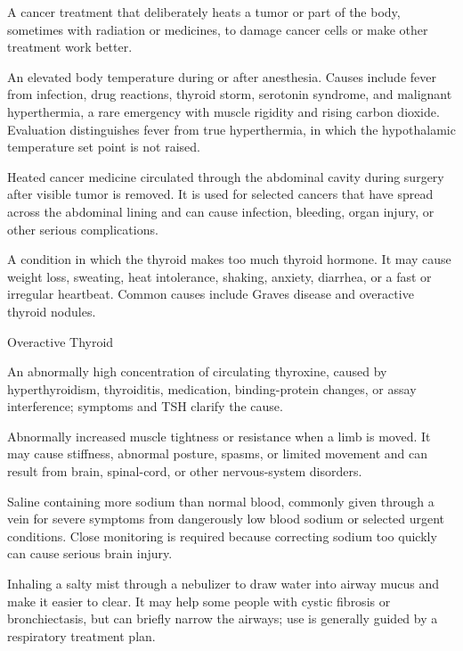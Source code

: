  A cancer treatment that deliberately heats a tumor or part of the body, sometimes with radiation or medicines, to damage cancer cells or make other treatment work better.

 An elevated body temperature during or after anesthesia. Causes include fever from infection, drug reactions, thyroid storm, serotonin syndrome, and malignant hyperthermia, a rare emergency with muscle rigidity and rising carbon dioxide. Evaluation distinguishes fever from true hyperthermia, in which the hypothalamic temperature set point is not raised.

 Heated cancer medicine circulated through the abdominal cavity during surgery after visible tumor is removed. It is used for selected cancers that have spread across the abdominal lining and can cause infection, bleeding, organ injury, or other serious complications.

 A condition in which the thyroid makes too much thyroid hormone. It may cause weight loss, sweating, heat intolerance, shaking, anxiety, diarrhea, or a fast or irregular heartbeat. Common causes include Graves disease and overactive thyroid nodules.

\synonyms
Overactive Thyroid

 An abnormally high concentration of circulating thyroxine, caused by hyperthyroidism, thyroiditis, medication, binding-protein changes, or assay interference; symptoms and TSH clarify the cause.

 Abnormally increased muscle tightness or resistance when a limb is moved. It may cause stiffness, abnormal posture, spasms, or limited movement and can result from brain, spinal-cord, or other nervous-system disorders.

 Saline containing more sodium than normal blood, commonly given through a vein for severe symptoms from dangerously low blood sodium or selected urgent conditions. Close monitoring is required because correcting sodium too quickly can cause serious brain injury.

 Inhaling a salty mist through a nebulizer to draw water into airway mucus and make it easier to clear. It may help some people with cystic fibrosis or bronchiectasis, but can briefly narrow the airways; use is generally guided by a respiratory treatment plan.

